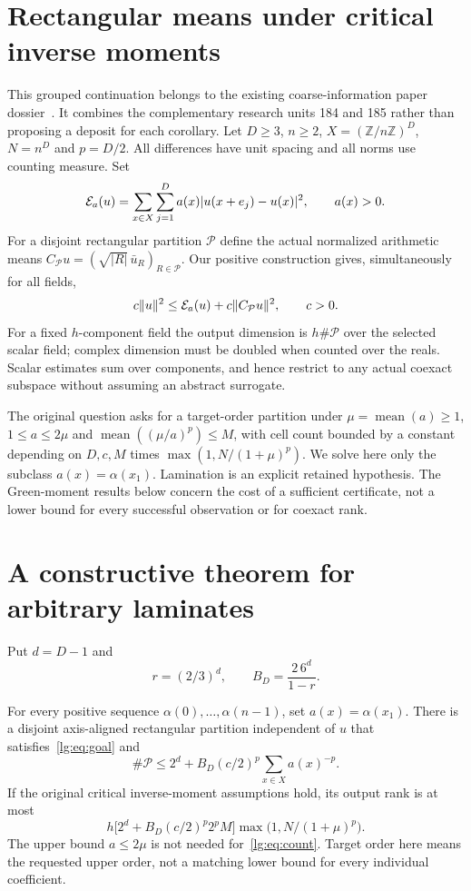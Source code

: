 \providecommand{\Var}{\operatorname{Var}}
\providecommand{\Pcal}{\mathcal P}
\clearpage
\section{Rectangular means under critical inverse moments}\label{sec:laminates187}
This grouped continuation belongs to the existing coarse-information paper
dossier~\cite{lg:programme}. It combines the complementary research units 184
and 185 rather than proposing a deposit for each corollary. Let $D\ge3$,
$n\ge2$, $X=(\mathbb Z/n\mathbb Z)^D$, $N=n^D$ and $p=D/2$.
All differences have unit spacing and all norms use counting measure. Set
\[
 \mathcal E_a(u)=\sum_{x\in X}\sum_{j=1}^D
 a(x)|u(x+e_j)-u(x)|^2,\qquad a(x)>0.
\]
For a disjoint rectangular partition $\Pcal$ define the actual normalized
arithmetic means $C_{\Pcal}u=(\sqrt{|R|}\,\bar u_R)_{R\in\Pcal}$.
Our positive construction gives, simultaneously for all fields,
\begin{equation}\label{lg:eq:goal}
 c\|u\|^2\le\E_a(u)+c\|C_{\Pcal}u\|^2,\qquad c>0.
\end{equation}
For a fixed $h$-component field the output dimension is $h\#\Pcal$ over
the selected scalar field; complex dimension must be doubled when counted
over the reals. Scalar estimates sum over components, and hence restrict
to any actual coexact subspace without assuming an abstract surrogate.

The original question asks for a target-order partition under
$\mu=\operatorname{mean}(a)\ge1$, $1\le a\le2\mu$ and
$\operatorname{mean}((\mu/a)^p)\le M$, with cell count bounded by a constant
depending on $D,c,M$ times $\max(1,N/(1+\mu)^p)$. We solve here only the
subclass $a(x)=\alpha(x_1)$. Lamination is an explicit retained hypothesis.
The Green-moment results below concern the cost of a sufficient certificate,
not a lower bound for every successful observation or for coexact rank.

\section{A constructive theorem for arbitrary laminates}
Put $d=D-1$ and
\[
 r=(2/3)^d,\qquad B_D=\frac{2\,6^d}{1-r}.
\]
\begin{theorem}\label{lg:thm:laminate}
For every positive sequence $\alpha(0),\ldots,\alpha(n-1)$, set
$a(x)=\alpha(x_1)$. There is a disjoint axis-aligned rectangular partition
independent of $u$ that satisfies~\eqref{lg:eq:goal} and
\begin{equation}\label{lg:eq:count}
 \#\Pcal\le2^d+B_D(c/2)^p\sum_{x\in X}a(x)^{-p}.
\end{equation}
If the original critical inverse-moment assumptions hold, its output rank
is at most
\[
 h\bigl[2^d+B_D(c/2)^p2^p M\bigr]
 \max\bigl(1,N/(1+\mu)^p\bigr).
\]
The upper bound $a\le2\mu$ is not needed for~\eqref{lg:eq:count}.
Target order here means the requested upper order, not a matching lower
bound for every individual coefficient.
\end{theorem}

